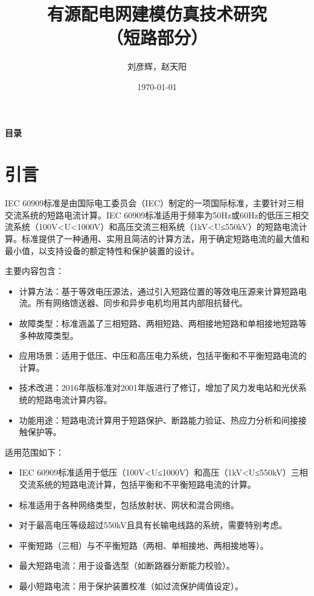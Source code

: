 \documentclass[a4paper,11pt,AutoFakeBold]{ctexart}
\title{\textbf{有源配电网建模仿真技术研究\\（短路部分）}}
\author{刘彦辉，赵天阳}
\date{\today}
\begin{document}
\maketitle

\clearpage  %
{\centering  %
\Large\bfseries  %
目录 
\par}  %
\tableofcontents
{}

\newpage
\section{引言}

IEC 60909标准是由国际电工委员会（IEC）制定的一项国际标准，主要针对三相交流系统的短路电流计算。IEC 60909标准适用于频率为50Hz或60Hz的低压三相交流系统（100V<U<1000V）和高压交流三相系统（1kV<U≤550kV）的短路电流计算。标准提供了一种通用、实用且简洁的计算方法，用于确定短路电流的最大值和最小值，以支持设备的额定特性和保护装置的设计。

主要内容包含：
\begin{itemize}
    \item 计算方法：基于等效电压源法，通过引入短路位置的等效电压源来计算短路电流。所有网络馈送器、同步和异步电机均用其内部阻抗替代。
    \item 故障类型：标准涵盖了三相短路、两相短路、两相接地短路和单相接地短路等多种故障类型。
    \item 应用场景：适用于低压、中压和高压电力系统，包括平衡和不平衡短路电流的计算。
    \item 技术改进：2016年版标准对2001年版进行了修订，增加了风力发电站和光伏系统的短路电流计算内容。
    \item 功能用途：短路电流计算用于短路保护、断路能力验证、热应力分析和间接接触保护等。
\end{itemize}


适用范围如下：
\begin{itemize}
    \item IEC 60909标准适用于低压（100V<U≤1000V）和高压（1kV<U≤550kV）三相交流系统的短路电流计算，包括平衡和不平衡短路电流的计算。
    \item 标准适用于各种网络类型，包括放射状、网状和混合网络。
    \item 对于最高电压等级超过550kV且具有长输电线路的系统，需要特别考虑。
    \item 平衡短路（三相）与不平衡短路（两相、单相接地、两相接地等）。
    \item 最大短路电流：用于设备选型（如断路器分断能力校验）。
    \item 最小短路电流：用于保护装置校准（如过流保护阈值设定）。
\end{itemize}
\end{document}
